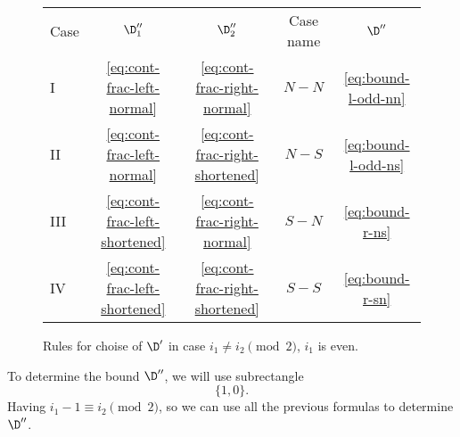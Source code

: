 \begin{figure}[ht]
	\centering
	\begin{tabular}{| l | c c c | c |}
		\cline{1-5}
		Case & $\D_1''$ & $\D_2''$ & Case name & $\D''$ \\
		\cline{1-5}
			I &
			\ref{eq:cont-frac-left-normal} &
			\ref{eq:cont-frac-right-normal} &
			$N-N$ &
			\ref{eq:bound-l-odd-nn}
		\\
			II &
			\ref{eq:cont-frac-left-normal} &
			\ref{eq:cont-frac-right-shortened} &
			$N-S$ &
			\ref{eq:bound-l-odd-ns}
		\\
			III &
			\ref{eq:cont-frac-left-shortened} &
			\ref{eq:cont-frac-right-normal} &
			$S-N$ &
			\ref{eq:bound-r-ns}
		\\
			IV &
			\ref{eq:cont-frac-left-shortened} &
			\ref{eq:cont-frac-right-shortened} &
			$S-S$ &
			\ref{eq:bound-r-sn}
		\\
		\cline{1-5}
	\end{tabular}
	\caption{Rules for choise of $\D'$ in case $i_1 \ne i_2 \pmod 2$, $i_1$ is even.}
	\label{fg:rectangle-l-odd-bound-choise}
\end{figure}

To determine the bound $\D''$, we will use subrectangle
\begin{equation*}
	\{1, 0\}.
\end{equation*}
Having $i_1 - 1 \equiv i_2 \pmod 2$, so we can use all the previous formulas to determine $\D''$.
